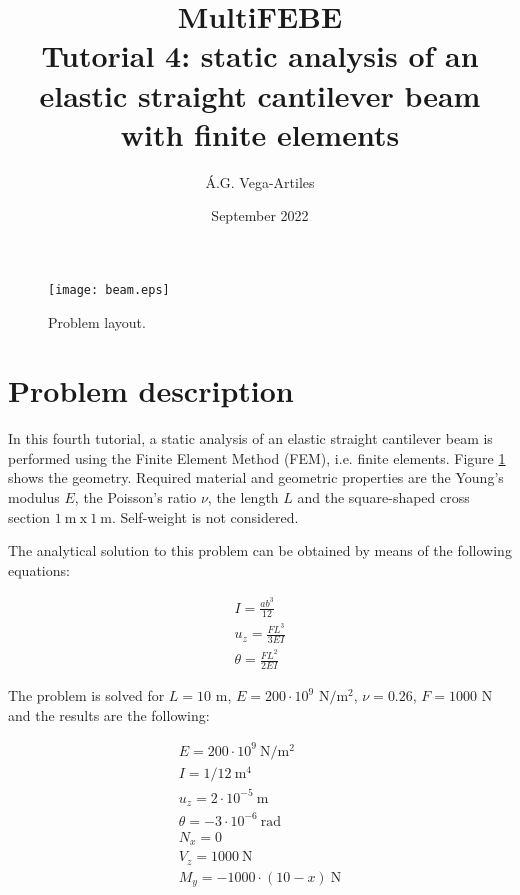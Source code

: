 \documentclass[a4]{article}
\title{MultiFEBE \\ Tutorial 4: static analysis of an elastic straight cantilever beam with finite elements}
\author{\'A.G. Vega-Artiles}
\date{September 2022}
\begin{document}
\maketitle

\begin{figure}[h]
	\centering
	\texttt{[image: beam.eps]}
	\caption{Problem layout.}
	\label{fig:beam}
\end{figure}

\section{Problem description}

In this fourth tutorial, a static analysis of an elastic straight cantilever beam is performed using the Finite Element Method (FEM), i.e. finite elements. Figure \ref{fig:beam} shows the geometry. Required material and geometric properties are the Young's modulus $E$, the Poisson's ratio $\nu$, the length $L$ and the square-shaped cross section $1 \medspace \mathrm{m} \medspace \mathrm{x} \medspace 1 \medspace \mathrm{m}$. Self-weight is not considered. 

The analytical solution to this problem can be obtained by means of the following equations:

\begin{equation}
	\begin{array}{l}
		I = \frac{ab^3}{12} \\
		u_z = \frac{FL^3}{3EI} \\
		\theta = \frac{FL^2}{2EI}
	\end{array}
\end{equation}

The problem is solved for $L=10$ $\mathrm{m}$, $E=200\cdot 10^9$ $\mathrm{N/m^2}$, $\nu=0.26$, $F=1000$ $\mathrm{N}$ and the results are the following: 

\begin{equation}
	\begin{array}{l}
		E = 200\cdot 10^9 \medspace \mathrm{N/m^2} \\
		I = 1/12 \medspace \mathrm{m^4} \\
		u_z = 2\cdot 10^{-5} \medspace \mathrm{m}\\
		\theta =  -3\cdot 10^{-6} \medspace \mathrm{rad}\\
		N_{x} = 0\\
		V_{z} = 1000 \medspace \mathrm{N}\\
		M_{y} = -1000\cdot(10-x)\medspace \mathrm{N}
	\end{array}
\end{equation}
\end{document}
